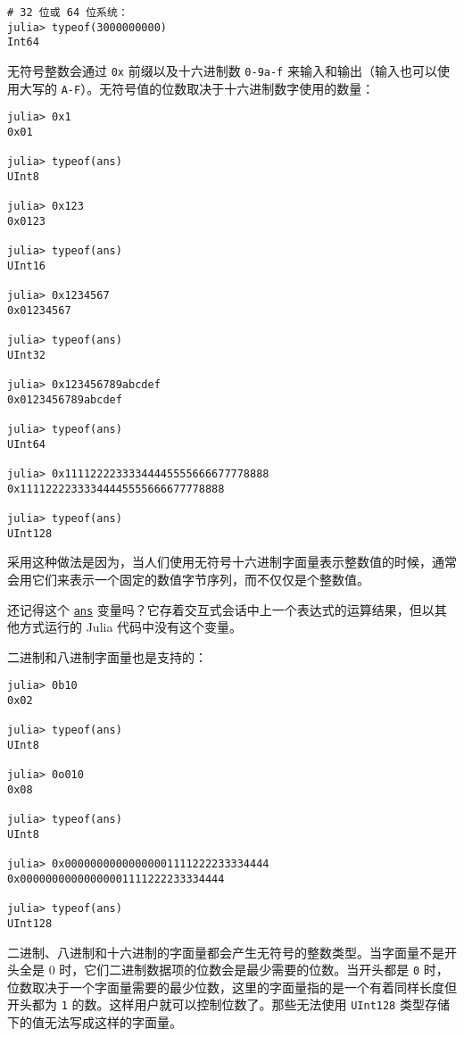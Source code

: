 \begin{verbatim}
# 32 位或 64 位系统：
julia> typeof(3000000000)
Int64
\end{verbatim}



无符号整数会通过 \texttt{0x} 前缀以及十六进制数 \texttt{0-9a-f} 来输入和输出（输入也可以使用大写的 \texttt{A-F}）。无符号值的位数取决于十六进制数字使用的数量：




\begin{verbatim}
julia> 0x1
0x01

julia> typeof(ans)
UInt8

julia> 0x123
0x0123

julia> typeof(ans)
UInt16

julia> 0x1234567
0x01234567

julia> typeof(ans)
UInt32

julia> 0x123456789abcdef
0x0123456789abcdef

julia> typeof(ans)
UInt64

julia> 0x11112222333344445555666677778888
0x11112222333344445555666677778888

julia> typeof(ans)
UInt128
\end{verbatim}



采用这种做法是因为，当人们使用无符号十六进制字面量表示整数值的时候，通常会用它们来表示一个固定的数值字节序列，而不仅仅是个整数值。



还记得这个 \hyperlink{11288188119698492222}{\texttt{ans}} 变量吗？它存着交互式会话中上一个表达式的运算结果，但以其他方式运行的 Julia 代码中没有这个变量。



二进制和八进制字面量也是支持的：




\begin{verbatim}
julia> 0b10
0x02

julia> typeof(ans)
UInt8

julia> 0o010
0x08

julia> typeof(ans)
UInt8

julia> 0x00000000000000001111222233334444
0x00000000000000001111222233334444

julia> typeof(ans)
UInt128
\end{verbatim}



二进制、八进制和十六进制的字面量都会产生无符号的整数类型。当字面量不是开头全是 0 时，它们二进制数据项的位数会是最少需要的位数。当开头都是 \texttt{0} 时，位数取决于一个字面量需要的最少位数，这里的字面量指的是一个有着同样长度但开头都为 \texttt{1} 的数。这样用户就可以控制位数了。那些无法使用 \texttt{UInt128} 类型存储下的值无法写成这样的字面量。



